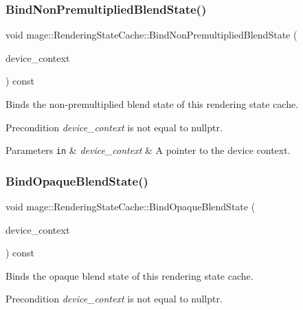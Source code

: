 \subsubsection{\texorpdfstring{Bind\+Non\+Premultiplied\+Blend\+State()}{BindNonPremultipliedBlendState()}}
{\footnotesize\ttfamily void mage\+::\+Rendering\+State\+Cache\+::\+Bind\+Non\+Premultiplied\+Blend\+State (\begin{DoxyParamCaption}\item[{I\+D3\+D11\+Device\+Context2 $\ast$}]{device\+\_\+context }\end{DoxyParamCaption}) const\hspace{0.3cm}{\ttfamily [noexcept]}}

Binds the non-\/premultiplied blend state of this rendering state cache.

\begin{DoxyPrecond}{Precondition}
{\itshape device\+\_\+context} is not equal to {\ttfamily nullptr}. 
\end{DoxyPrecond}

\begin{DoxyParams}[1]{Parameters}
\mbox{\tt in}  & {\em device\+\_\+context} & A pointer to the device context. \\
\hline
\end{DoxyParams}
\hypertarget{structmage_1_1_rendering_state_cache_ad00fcf84f2dc269a1abbf2ece3c653c4}{}\label{structmage_1_1_rendering_state_cache_ad00fcf84f2dc269a1abbf2ece3c653c4} 
\subsubsection{\texorpdfstring{Bind\+Opaque\+Blend\+State()}{BindOpaqueBlendState()}}
{\footnotesize\ttfamily void mage\+::\+Rendering\+State\+Cache\+::\+Bind\+Opaque\+Blend\+State (\begin{DoxyParamCaption}\item[{I\+D3\+D11\+Device\+Context2 $\ast$}]{device\+\_\+context }\end{DoxyParamCaption}) const\hspace{0.3cm}{\ttfamily [noexcept]}}

Binds the opaque blend state of this rendering state cache.

\begin{DoxyPrecond}{Precondition}
{\itshape device\+\_\+context} is not equal to {\ttfamily nullptr}. 
\end{DoxyPrecond}

